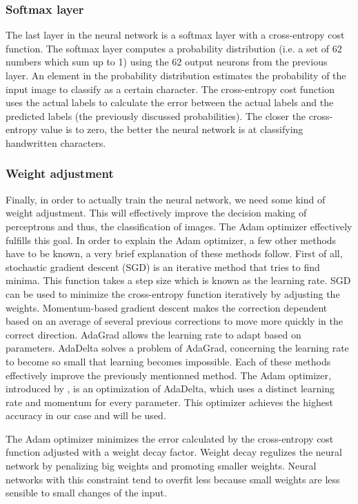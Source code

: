 \documentclass{article}
\begin{document}
\subsubsection{Softmax layer}
 The last layer in the neural network is a softmax layer with a cross-entropy cost function. The softmax layer computes a probability distribution (i.e. a set of 62 numbers which sum up to 1) using the 62 output neurons from the previous layer. An element in the probability distribution estimates the probability of the input image to classify as a certain character.
 The cross-entropy cost function uses the actual labels to calculate the error between the actual labels and the predicted labels (the previously discussed probabilities). The closer the cross-entropy value is to zero, the better the neural network is at classifying handwritten characters.
 \subsubsection{Weight adjustment}
Finally, in order to actually train the neural network, we need some kind of weight adjustment. This will effectively improve the decision making of perceptrons and thus, the classification of images.
The Adam optimizer effectively fulfills this goal. In order to explain the Adam optimizer, a few other methods have to be known, a very brief explanation of these methods follow.
First of all, stochastic gradient descent (SGD) is an iterative method that tries to find minima. This function takes a step size which is known as the learning rate. SGD can be used to minimize the cross-entropy function iteratively by adjusting the weights.
Momentum-based gradient descent makes the correction dependent based on an average of several previous corrections to move more quickly in the correct direction.
AdaGrad allows the learning rate to adapt based on parameters. AdaDelta solves a problem of AdaGrad, concerning the learning rate to become so small that learning becomes impossible.
Each of these methods effectively improve the previously mentionned method.
The Adam optimizer, introduced by \cite{adam}, is an optimization of AdaDelta, which uses a distinct learning rate and momentum for every parameter. This optimizer achieves the highest accuracy in our case and will be used.

The Adam optimizer minimizes the error calculated by the cross-entropy cost function adjusted with a weight decay factor. Weight decay regulizes the neural network by penalizing big weights and promoting smaller weights. Neural networks with this constraint tend to overfit less because small weights are less sensible to small changes of the input. \cite{presham}
\end{document}

